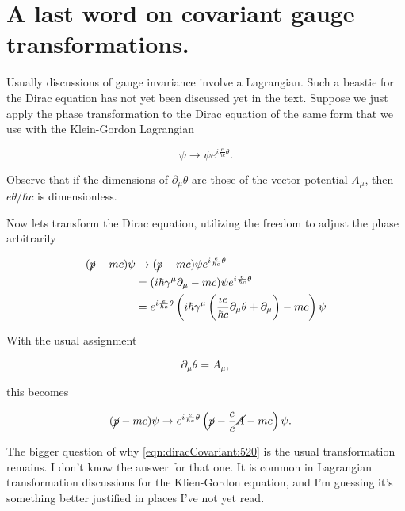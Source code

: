 \section{A last word on covariant gauge transformations.}

Usually discussions of gauge invariance involve a Lagrangian.  Such a beastie for the Dirac equation has not yet been discussed yet in the text.  Suppose we just apply the phase transformation to the Dirac equation of the same form that we use with the Klein-Gordon Lagrangian

\begin{equation}\label{eqn:diracCovariant:500}
\psi \rightarrow \psi e^{i \frac{e }{\hbar c} \theta}.
\end{equation}

Observe that if the dimensions of $\partial_\mu \theta$ are those of the vector potential $A_\mu$, then $e \theta/\hbar c$ is dimensionless.

Now lets transform the Dirac equation, utilizing the freedom to adjust the phase arbitrarily

\begin{align*}
(\cancel{p} - m c) \psi
&\rightarrow
(\cancel{p} - m c )\psi e^{i \frac{e}{\hbar c} \theta } \\
&=
(i \hbar \gamma^\mu \partial_\mu - m c) \psi e^{i \frac{e}{\hbar c} \theta } \\
&=
e^{i \frac{e}{\hbar c} \theta } 
\left(
i \hbar \gamma^\mu \left( \frac{ i e }{\hbar c} \partial_\mu \theta + \partial_\mu \right)  - m c
\right) \psi \\
\end{align*}

With the usual assignment 

\begin{equation}\label{eqn:diracCovariant:520}
\partial_\mu \theta = A_\mu,
\end{equation}

this becomes

\begin{align*}
(\cancel{p} - m c) \psi
&\rightarrow
e^{i \frac{e}{\hbar c} \theta } 
\left(
\cancel{p} - \frac{e}{c} \cancel{A} - m c
\right) \psi.
\end{align*}

The bigger question of why \ref{eqn:diracCovariant:520} is the usual transformation remains.  I don't know the answer for that one.  It is common in Lagrangian transformation discussions for the Klien-Gordon equation, and I'm guessing it's something better justified in places I've not yet read.

